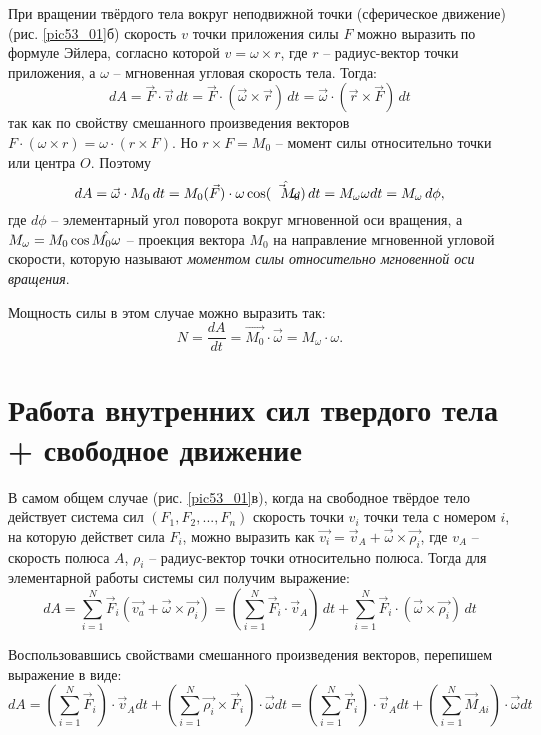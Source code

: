 При вращении твёрдого тела вокруг неподвижной точки 
(сферическое движение) (рис. \ref{pic53_01}б) скорость \( v \) точки 
приложения силы \( F \) можно выразить по 
формуле Эйлера, согласно которой \( v = \omega\times r \), где 
\( r \) -- радиус-вектор точки приложения, а \( \omega \) -- 
мгновенная угловая скорость тела. Тогда:
\[ 
	dA = \vec{F}\cdot\vec{v}\,dt = 
	\vec{F}\cdot\left(\vec{\omega}\times\vec{r}\right)\,dt =
	\vec{\omega}\cdot\left(\vec{r}\times\vec{F}\right)\,dt
\]
так как по свойству смешанного произведения векторов 
\( F\cdot\left( \omega\times r\right) = \omega\cdot\left( r\times F\right) \). 
Но \( r\times F = M_0 \) -- момент силы относительно точки или 
центра \( O \). Поэтому 
\[ 
	dA = \vec{\omega}\cdot M_0\,dt = 
	M_0(\vec{F})\cdot\omega\cos(\Hat{\vec{M_0}\omega})\,dt =
	M_\omega\omega dt = M_\omega\,d\phi,
\]
где \( d\phi \) -- элементарный угол поворота вокруг мгновенной оси 
вращения, а \( M_\omega = M_0\cos\Hat{M_0\omega} \) -- 
проекция вектора \( M_0 \) на направление мгновенной угловой 
скорости, которую называют \emph{моментом силы относительно мгновенной 
оси вращения}.

Мощность силы в этом случае можно выразить так:
\[ 
	N = \frac{dA}{dt} = \vec{M_0}\cdot\vec{\omega} = M_\omega\cdot\omega.
\]

\section{Работа внутренних сил твердого тела + свободное движение}

В самом общем случае (рис. \ref{pic53_01}в), когда на свободное твёрдое тело 
действует система сил \( \left( F_1, F_2, ..., F_n \right) \) скорость 
точки \( v_i \) точки тела с номером \( i \), на которую действет сила 
\( F_i \), можно выразить как 
\( \vec{v_i} = \vec{v}_A + \vec{\omega}\times\vec{\rho_i} \), 
где \( v_A \) -- скорость полюса \( A \), \( \rho_i \) -- радиус-вектор 
точки относительно полюса. Тогда для элементарной работы системы сил 
получим выражение:
\[ 
	dA = \sum_{i=1}^{N} \vec{F}_i
	(\vec{v_a} + \vec{\omega}\times\vec{\rho_i}) =
	\left(\sum_{i=1}^{N}\vec{F}_i\cdot\vec{v}_A\right)\,dt + 
	\sum_{i=1}^{N}\vec{F}_i\cdot(\vec{\omega}\times\vec{\rho_i})\,dt
\]

Воспользовавшись свойствами смешанного произведения векторов, перепишем 
выражение в виде:
\[ 
	dA = \left( \sum_{i=1}^{N}\vec{F}_i \right)\cdot\vec{v}_Adt + 
	\left( \sum_{i=1}^{N} \vec{\rho_i}\times\vec{F}_i\right)\cdot\vec{\omega}dt = 
	\left( \sum_{i=1}^{N}\vec{F}_i \right)\cdot\vec{v}_Adt + 
	\left( \sum_{i=1}^{N} \vec{M}_{Ai} \right)\cdot\vec{\omega}dt
\]

